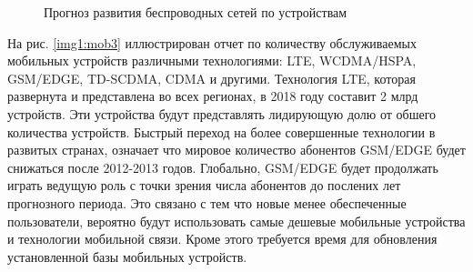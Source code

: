 \pgfplotsset{width=15cm, height=10cm, compat=1.3}
\begin{figure} [!h]
  \center
{}
\caption{Прогноз развития беспроводных сетей по устройствам \cite{ericsson}}
  \label{img1:mob2}
\end{figure}




На рис. \ref{img1:mob3} иллюстрирован отчет по количеству обслуживаемых мобильных устройств различными технологиями: LTE, WCDMA/HSPA,\\ GSM/EDGE, TD-SCDMA, CDMA и другими. Технология LTE, которая развернута и представлена во всех регионах, в 2018 году составит 2 млрд устройств. Эти устройства будут представлять лидирующую долю от обшего количества устройств. Быстрый переход на более совершенные технологии в развитых странах, означает что мировое количество абонентов GSM/EDGE будет снижаться после 2012-2013 годов. Глобально, GSM/EDGE будет продолжать играть ведущую роль с точки зрения числа абонентов до послених лет прогнозного периода. Это связано с тем что новые менее обеспеченные пользователи, вероятно будут использовать самые дешевые мобильные устройства и технологии мобильной связи. Кроме этого требуется время для обновления установленной базы мобильных устройств.


